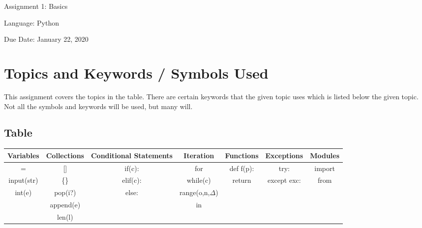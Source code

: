 \documentclass[12pt]{report}
\begin{document}
\begin{titlepage}
    \begin{center}
\vspace*{9cm}
  \begin{LARGE}
        Assignment 1: Basics    
    \end{LARGE}

    \vspace*{0.5cm}
    
    \begin{Large}
        Language: Python
    \end{Large}

    \vspace*{0.5cm}

    \begin{Large}
        Due Date: January 22, 2020
    \end{Large}
\end{center}
\end{titlepage}
\section*{Topics and Keywords / Symbols Used}

This assignment covers the topics in the table. 
There are certain keywords that the given topic uses which is listed below the given topic. 
Not all the symbols and keywords will be used, but many will.


\subsection*{Table}

\begin{tabular}{ | c | c | c | c | c | c | c |}
    \hline
    Variables & Collections & Conditional Statements & Iteration & Functions & Exceptions & Modules \\
    \hline
    \noalign{\smallskip}\noalign{\smallskip}\noalign{\smallskip}\noalign{\smallskip}
    \hline
    = & [] & if(c): & for & def f(p):& try: & import \\
    \hline
    input(str) & \{\} & elif(c): & while(c) & return & except exc: & from \\
    \hline
    int(e) & pop(i?) & else: & range(o,n,${\Delta}$) &&& \\
    \hline
    & append(e) && in &&&\\ 
    \hline
    & len(l) &&&&& \\
    \hline

\end{tabular}
\end{document}
